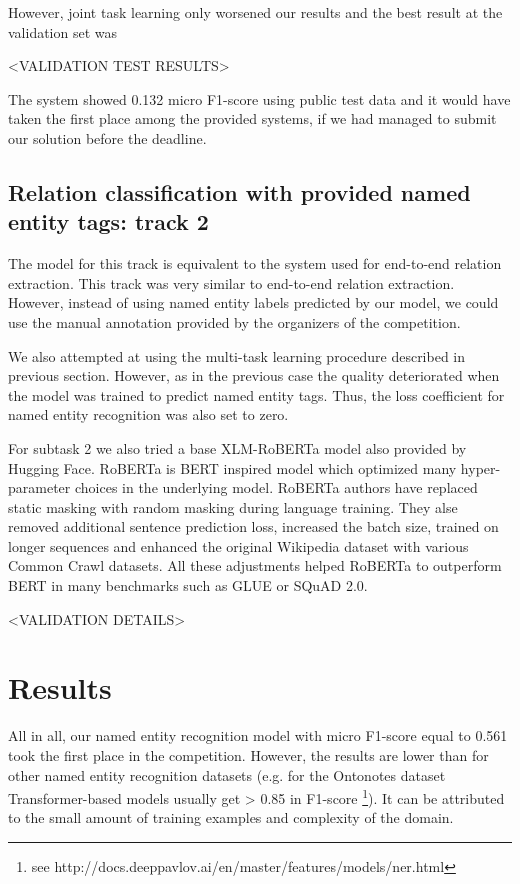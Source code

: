\documentclass{dialogue}
\begin{document}
	However, joint task learning only worsened our results and the best result at the validation set was
	
	<VALIDATION TEST RESULTS>
	
	The system showed 0.132 micro F1-score using public test data and it would have taken the first place among the provided systems, if we had managed to submit our solution before the deadline.
	\subsection{Relation classification with provided named entity tags: track 2}
	The model for this track is equivalent to the system used for end-to-end relation extraction. This track was very similar to end-to-end relation extraction. However, instead of using named entity labels predicted by our model, we could use the manual annotation provided by the organizers of the competition.
	
	We also attempted at using the multi-task learning procedure described in previous section. However, as in the previous case the quality deteriorated when the model was trained to predict named entity tags. Thus, the loss coefficient for named entity recognition was also set to zero.
	
	For subtask 2 we also tried a base XLM-RoBERTa \cite{roberta} model also provided by Hugging Face. RoBERTa is BERT inspired model which optimized many hyper-parameter choices in the underlying model. RoBERTa authors have replaced static masking with random masking during language training. They alse removed additional sentence prediction loss, increased the batch size, trained on longer sequences and enhanced the original Wikipedia dataset with various Common Crawl datasets. All these adjustments helped RoBERTa to outperform BERT in many benchmarks such as GLUE or SQuAD 2.0.
	
	<VALIDATION DETAILS>
	
	\section{Results}
	All in all, our named entity recognition model with micro F1-score equal to 0.561 took the first place in the competition. However, the results are lower than for other named entity recognition datasets (e.g. for the Ontonotes dataset Transformer-based models usually get > 0.85 in F1-score \footnote{see http://docs.deeppavlov.ai/en/master/features/models/ner.html}). It can be attributed to the small amount of training examples and complexity of the domain.
	
\end{document}

